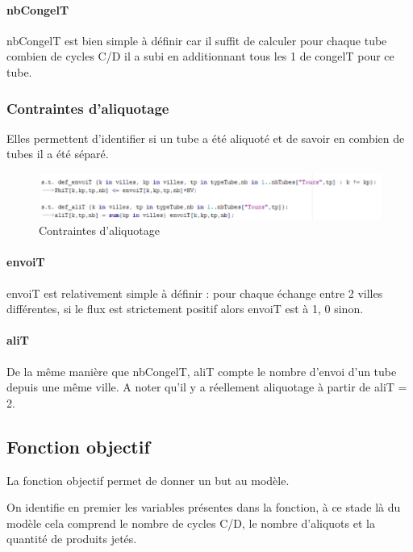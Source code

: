 \documentclass{polytech/polytech}
\numberwithin{figure}{chapter}
\begin{document}
\paragraph{nbCongelT}

nbCongelT est bien simple à définir car il suffit de calculer pour chaque tube combien de cycles C/D il a subi en additionnant tous les 1 de congelT pour ce tube.

\subsubsection{Contraintes d'aliquotage}

Elles permettent d'identifier si un tube a été aliquoté et de savoir en combien de tubes il a été séparé.
\begin{figure}[ht]
    \centering
    \includegraphics[width=\textwidth]{pic/aliquotage.png}
    \caption{Contraintes d'aliquotage}
\end{figure}

\paragraph{envoiT}

envoiT est relativement simple à définir : pour chaque échange entre 2 villes différentes, si le flux est strictement positif alors envoiT est à 1, 0 sinon.

\paragraph{aliT}

De la même manière que nbCongelT, aliT compte le nombre d'envoi d'un tube depuis une même ville. A noter qu'il y a réellement \gls{aliquotage} à partir de aliT = 2.

\subsection{Fonction objectif}

La fonction objectif permet de donner un but au modèle.

On identifie en premier les variables présentes dans la fonction, à ce stade là du modèle cela comprend le nombre de cycles C/D, le nombre d'aliquots et la quantité de produits jetés.
\end{document}
